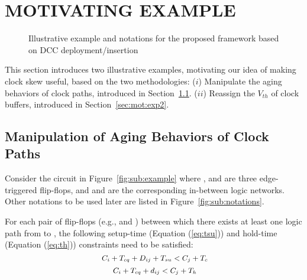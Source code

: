 \section{MOTIVATING EXAMPLE}
\label{sec:motivate}
\begin{figure*}[!ht]
    \centering
    \hspace{1.6cm}
    \caption{Illustrative example and notations for the proposed framework based on DCC deployment/insertion}
    \label{fig:en}
\end{figure*}


This section introduces two illustrative examples, motivating our idea of making clock skew useful, based on the two methodologies: ($i$) Manipulate the aging behaviors of clock paths, introduced in Section~\ref{sec:mot:exp1}. ($ii$) Reassign the $V_{th}$ of clock buffers, introduced in Section~\ref{sec:mot:exp2}. %

\subsection{Manipulation of Aging Behaviors of Clock Paths}
\label{sec:mot:exp1}
Consider the circuit in Figure~\ref{fig:sub:example} where ,  and  are three edge-triggered flip-flops, and  and  are the corresponding in-between logic networks. Other notations to be used later are listed in Figure~\ref{fig:sub:notations}.

For each pair of flip-flops (e.g.,  and ) between which there exists at least one logic path from  to , the following setup-time (Equation (\ref{eq:tsu})) and hold-time (Equation (\ref{eq:th})) constraints need to be satisfied:
\begin{equation}
	\mbox{\fontsize{9}{9.6} $C_i+T_{cq}+D_{ij}+T_{su}<C_j+T_c$}
	\label{eq:tsu}
\end{equation}
\begin{equation}
	\mbox{\fontsize{9}{9.6} $C_i+T_{cq}+d_{ij}<C_j+T_h$}
	\label{eq:th}
\end{equation}

